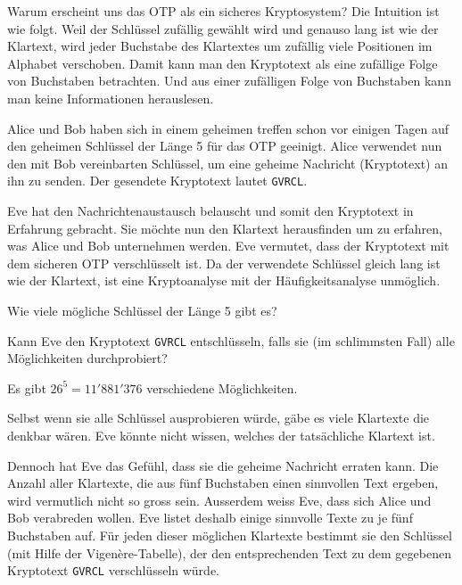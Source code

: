 Warum erscheint uns das \gls{OTP} als ein sicheres Kryptosystem? Die Intuition ist
wie folgt. Weil der Schlüssel zufällig gewählt wird und genauso lang ist wie der Klartext,
wird jeder Buchstabe des Klartextes um zufällig viele Positionen im Alphabet verschoben.
Damit kann man den Kryptotext als eine zufällige Folge von Buchstaben betrachten. Und
aus einer zufälligen Folge von Buchstaben kann man keine Informationen herauslesen.

Alice und Bob haben sich in einem geheimen treffen schon vor einigen Tagen auf den geheimen Schlüssel der Länge 5 für das \gls{OTP} geeinigt. Alice verwendet nun den mit Bob vereinbarten Schlüssel, um eine geheime Nachricht (Kryptotext) an ihn zu senden. Der gesendete Kryptotext lautet \verb|GVRCL|.

Eve hat den Nachrichtenaustausch belauscht und somit den Kryptotext in Erfahrung
gebracht. Sie möchte nun den Klartext herausfinden um zu erfahren, was Alice und Bob
unternehmen werden. Eve vermutet, dass der Kryptotext mit dem sicheren \gls{OTP} verschlüsselt ist. Da der verwendete Schlüssel gleich lang ist wie der Klartext, ist eine Kryptoanalyse mit der Häufigkeitsanalyse unmöglich.

\begin{myexercise}
	\begin{aenum}
		\item Wie viele mögliche Schlüssel der Länge 5 gibt es?
		\item Kann Eve den Kryptotext \verb|GVRCL| entschlüsseln, falls sie (im schlimmsten Fall) alle Möglichkeiten durchprobiert?
	\end{aenum}
	\begin{myanswer}
		\begin{aenum}
			\item Es gibt $26^5 = 11'881'376$ verschiedene Möglichkeiten.
			\item Selbst wenn sie alle Schlüssel ausprobieren würde, gäbe es viele Klartexte die denkbar wären. Eve könnte nicht wissen, welches der tatsächliche Klartext ist.
		\end{aenum}
	\end{myanswer}
\end{myexercise}
Dennoch hat Eve das Gefühl, dass sie die geheime Nachricht erraten kann.
Die Anzahl aller Klartexte, die aus fünf Buchstaben einen sinnvollen Text ergeben, wird
vermutlich nicht so gross sein. Ausserdem weiss Eve, dass sich Alice und Bob verabreden
wollen. Eve listet deshalb einige sinnvolle Texte zu je fünf Buchstaben auf. Für jeden dieser
möglichen Klartexte bestimmt sie den Schlüssel (mit Hilfe der Vigenère-Tabelle), der den entsprechenden Text zu dem
gegebenen Kryptotext \verb|GVRCL| verschlüsseln würde.

